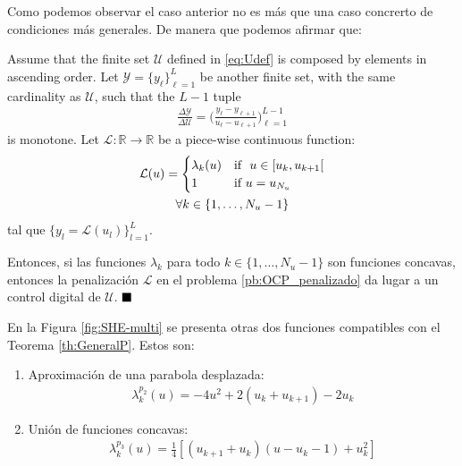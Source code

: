 Como podemos observar el caso anterior no es más que una caso concrerto de condiciones más generales. De manera que podemos afirmar que: 
\vspace{1em}
\begin{theorem}\label{th:GeneralP}
    Assume that the finite set $\mathcal{U}$ defined in \eqref{eq:Udef} is composed by elements in ascending order. Let $\mathcal{Y} = \{y_\ell\}_{\ell=1}^L$ be another finite set, with the same cardinality as $\mathcal U$, such that the $L-1$ tuple
    \begin{gather}
        \frac{\Delta \mathcal{Y}}{\Delta \mathcal{U}} = \Bigg( \frac{y_\ell - y_{\ell+1}}{u_\ell - u_{\ell+1}} \Bigg)_{\ell=1}^{L-1}
    \end{gather}  is monotone. Let $\mathcal{L}:\mathbb{R} \rightarrow \mathbb{R}$ be a piece-wise continuous function:
    \begin{gather}
        \mathcal{L}(u) = \begin{cases}
            \lambda_k(u) & \text{if }  u \in [u_k,u_{k+1}[ \\
            1 & \text{if } u = u_{N_u} 
        \end{cases} \\
        \notag \forall k \in \{1,\dots,N_u-1\}
    \end{gather}    
    tal que $\{y_l = \mathcal{L}(u_l)\}_{l=1}^L$. 
    
    Entonces, si las funciones $\lambda_k$ para todo $k \in  \{1,\dots,N_u-1\}$  son funciones concavas, entonces la penalización $\mathcal{L}$ en el problema \ref{pb:OCP_penalizado} da lugar a un control digital de $\mathcal{U}$.
    $\hfill \blacksquare$
\end{theorem}

En la Figura \ref{fig:SHE-multi} se presenta otras dos funciones  compatibles con el Teorema \ref{th:GeneralP}. Estos son:

\begin{enumerate}
    \item Aproximación de una parabola desplazada:
    \begin{gather}
        \lambda_k^{p_2}(u) = -4u^2 + 2(u_k + u_{k+1}) - 2u_{k}
    \end{gather}
    \item Unión de funciones concavas:
    \begin{gather}
        \lambda_k^{p_3}(u) = \frac 1 4[(u_{k+1}+u_{k}) (u-u_k-1) + u_k^2]
    \end{gather}
\end{enumerate}

